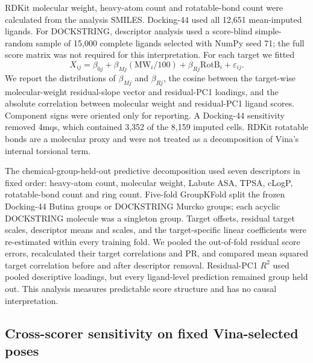 \documentclass[11pt]{article}
\begin{document}
RDKit molecular weight, heavy-atom count and rotatable-bond count were calculated from the
analysis SMILES. Docking-44 used all 12,651 mean-imputed ligands. For DOCKSTRING, descriptor
analysis used a score-blind simple-random sample of 15,000 complete ligands selected with
NumPy seed 71; the full score matrix was not required for this interpretation. For each
target we fitted
\begin{equation}
X_{ij}=\beta_{0j}+\beta_{Mj}(\mathrm{MW}_i/100)
       +\beta_{Rj}\mathrm{RotB}_i+\varepsilon_{ij}.
\end{equation}
We report the distributions of $\beta_{Mj}$ and $\beta_{Rj}$, the cosine between the
target-wise molecular-weight residual-slope vector and residual-PC1 loadings, and the
absolute correlation between molecular weight and residual-PC1 ligand scores. Component
signs were oriented only for reporting. A Docking-44 sensitivity removed 4mqs, which
contained 3,352 of the 8,159 imputed cells. RDKit rotatable bonds are a molecular proxy and
were not treated as a decomposition of Vina's internal torsional term.

The chemical-group-held-out predictive decomposition used seven descriptors in fixed order:
heavy-atom count, molecular weight, Labute ASA, TPSA, cLogP, rotatable-bond count and ring
count. Five-fold GroupKFold split the frozen Docking-44 Butina groups or DOCKSTRING Murcko
groups; each acyclic DOCKSTRING molecule was a singleton group. Target offsets, residual
target scales, descriptor means and scales, and the target-specific linear coefficients
were re-estimated within every training fold. We pooled the out-of-fold residual score
errors, recalculated their target correlations and PR, and compared mean squared target
correlation before and after descriptor removal. Residual-PC1 $R^2$ used pooled descriptive
loadings, but every ligand-level prediction remained group held out. This analysis measures
predictable score structure and has no causal interpretation.

\subsection{Cross-scorer sensitivity on fixed Vina-selected poses}
\end{document}
